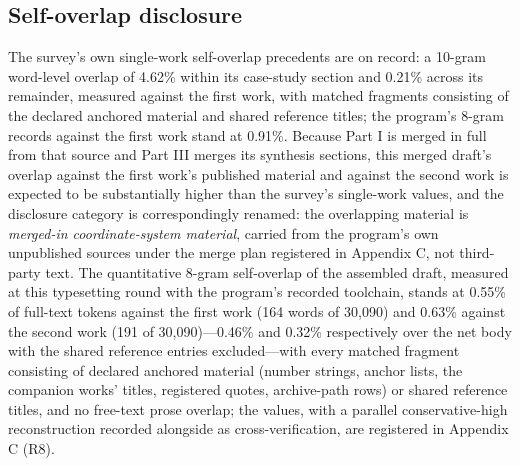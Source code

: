 \documentclass[11pt]{article}
\begin{document}
\subsection{Self-overlap disclosure}
\noindent The survey's own single-work self-overlap precedents are on record: a 10-gram word-level overlap of 4.62\% within its case-study section and 0.21\% across its remainder, measured against the first work, with matched fragments consisting of the declared anchored material and shared reference titles; the program's 8-gram records against the first work stand at 0.91\%. Because Part I is merged in full from that source and Part III merges its synthesis sections, this merged draft's overlap against the first work's published material and against the second work is expected to be substantially higher than the survey's single-work values, and the disclosure category is correspondingly renamed: the overlapping material is \emph{merged-in coordinate-system material}, carried from the program's own unpublished sources under the merge plan registered in Appendix C, not third-party text. The quantitative 8-gram self-overlap of the assembled draft, measured at this typesetting round with the program's recorded toolchain, stands at 0.55\% of full-text tokens against the first work (164 words of 30,090) and 0.63\% against the second work (191 of 30,090)—0.46\% and 0.32\% respectively over the net body with the shared reference entries excluded—with every matched fragment consisting of declared anchored material (number strings, anchor lists, the companion works' titles, registered quotes, archive-path rows) or shared reference titles, and no free-text prose overlap; the values, with a parallel conservative-high reconstruction recorded alongside as cross-verification, are registered in Appendix C (R8).\par
\end{document}

